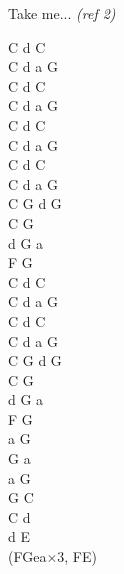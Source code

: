 \documentclass[a5paper, 10pt]{book}
\begin{document}
\begin{minipage}[t]{0.8\textwidth}
  \hspace*{3mm}Take me... \textit{\small (ref 2)}\\

\end{minipage}
\begin{minipage}[t]{0.2\textwidth}
  C d C\\
  C d a G\\
  C d C\\
  C d a G\\

  C d C\\
  C d a G\\
  C d C\\
  C d a G\\

  C G d G\\
  C G\\
  d G a\\
  F G\\

  C d C\\
  C d a G\\
  C d C\\
  C d a G\\

  C G d G\\
  C G\\
  d G a\\
  F G\\

  a G\\
  G a\\
  a G\\
  G C\\
  C d\\
  d E\\
  (FGea$\times$3, FE)\\
\end{minipage}

\newpage
\end{document}
